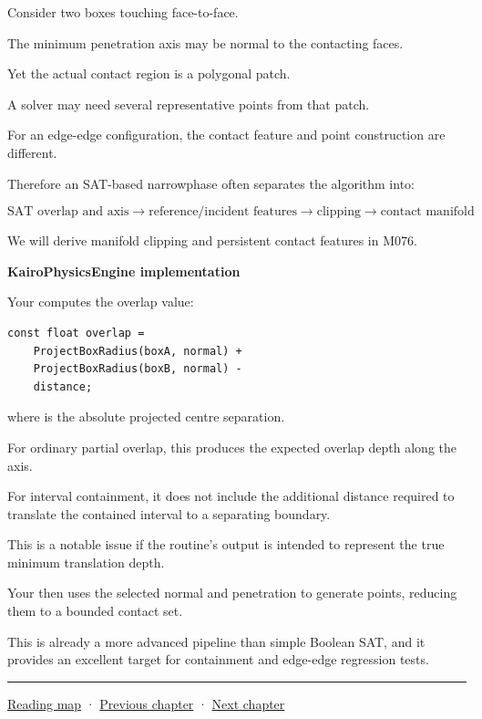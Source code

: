 Consider two boxes touching face-to-face.

The minimum penetration axis may be normal to the contacting faces.

Yet the actual contact region is a polygonal patch.

A solver may need several representative points from that patch.

For an edge-edge configuration, the contact feature and point construction are different.

Therefore an SAT-based narrowphase often separates the algorithm into:

\[
\boxed{ \text{SAT overlap and axis} \rightarrow \text{reference/incident features} \rightarrow \text{clipping} \rightarrow \text{contact manifold} }
\]

We will derive manifold clipping and persistent contact features in M076.

\textbf{KairoPhysicsEngine implementation}

Your  computes the overlap value:

\begin{verbatim}
const float overlap =
    ProjectBoxRadius(boxA, normal) +
    ProjectBoxRadius(boxB, normal) -
    distance;
\end{verbatim}

where  is the absolute projected centre separation.

For ordinary partial overlap, this produces the expected overlap depth along the axis.

For interval containment, it does not include the additional distance required to translate the contained interval to a separating boundary.

This is a notable issue if the routine's  output is intended to represent the true minimum translation depth.

Your  then uses the selected normal and penetration to generate points, reducing them to a bounded contact set.

This is already a more advanced pipeline than simple Boolean SAT, and it provides an excellent target for containment and edge-edge regression tests.

\begin{center}\rule{0.5\linewidth}{0.5pt}\end{center}

\hyperref[volume-reading-map]{Reading map} · \hyperref[04-visual-computing-ii-ch023-mesh-topology-and-connectivity]{Previous chapter} · \hyperref[04-visual-computing-ii-ch025-sat-for-triangle-and-convex-polygon-tests]{Next chapter}
